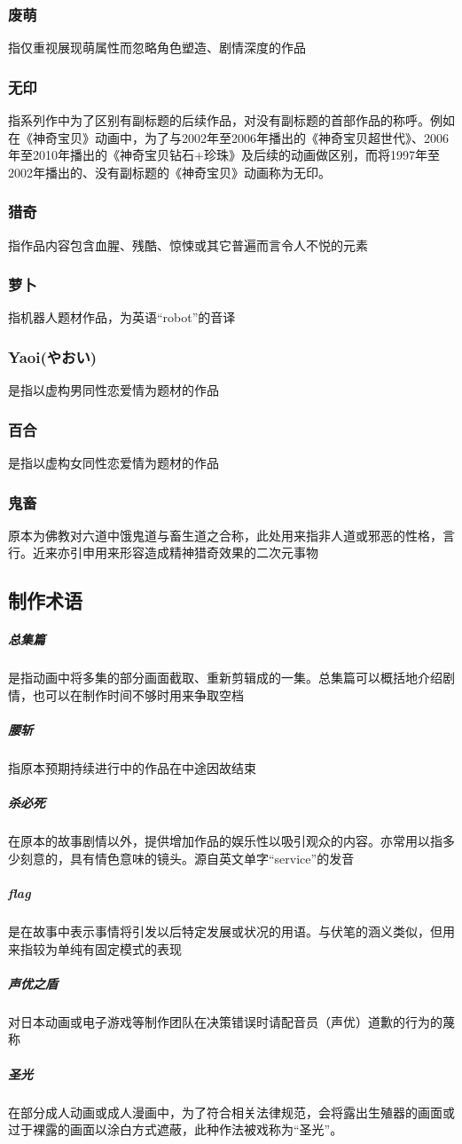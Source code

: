 \documentclass[UTF8,12pt]{ctexart}
\begin{document}
\subsubsection{废萌}指仅重视展现萌属性而忽略角色塑造、剧情深度的作品
\subsubsection{无印}指系列作中为了区别有副标题的后续作品，对没有副标题的首部作品的称呼。例如在《神奇宝贝》动画中，为了与2002年至2006年播出的《神奇宝贝超世代》、2006年至2010年播出的《神奇宝贝钻石+珍珠》及后续的动画做区别，而将1997年至2002年播出的、没有副标题的《神奇宝贝》动画称为无印。
\subsubsection{猎奇}指作品内容包含血腥、残酷、惊悚或其它普遍而言令人不悦的元素
\subsubsection{萝卜}指机器人题材作品，为英语“robot”的音译
\subsubsection{Yaoi(やおい)}是指以虚构男同性恋爱情为题材的作品
\subsubsection{百合}是指以虚构女同性恋爱情为题材的作品
\subsubsection{鬼畜}原本为佛教对六道中饿鬼道与畜生道之合称，此处用来指非人道或邪恶的性格，言行。近来亦引申用来形容造成精神猎奇效果的二次元事物
\subsection{制作术语}
\subparagraph{总集篇}是指动画中将多集的部分画面截取、重新剪辑成的一集。总集篇可以概括地介绍剧情，也可以在制作时间不够时用来争取空档
\subparagraph{腰斩}指原本预期持续进行中的作品在中途因故结束
\subparagraph{杀必死}在原本的故事剧情以外，提供增加作品的娱乐性以吸引观众的内容。亦常用以指多少刻意的，具有情色意味的镜头。源自英文单字“service”的发音
\subparagraph{flag}是在故事中表示事情将引发以后特定发展或状况的用语。与伏笔的涵义类似，但用来指较为单纯有固定模式的表现
\subparagraph{声优之盾}对日本动画或电子游戏等制作团队在决策错误时请配音员（声优）道歉的行为的蔑称
\subparagraph{圣光}在部分成人动画或成人漫画中，为了符合相关法律规范，会将露出生殖器的画面或过于裸露的画面以涂白方式遮蔽，此种作法被戏称为“圣光”。
\end{document}
